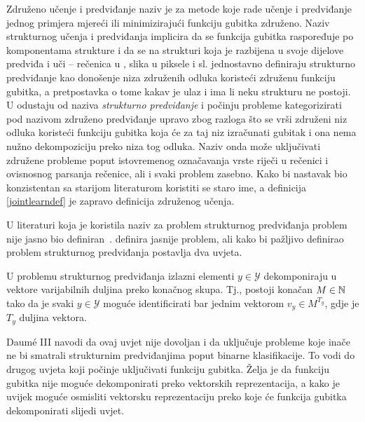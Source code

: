 Združeno učenje i predviđanje  naziv je
za metode koje rade učenje i predviđanje jednog primjera mjereći ili
minimizirajući funkciju gubitka združeno. Naziv strukturnog učenja i predviđanja
 implicira da se funkcija gubitka
raspoređuje po komponentama strukture i da se na strukturi koja je razbijena u
svoje dijelove predviđa i uči -- rečenica u , slika u piksele
i sl. \citet{daume14lts} jednostavno definiraju strukturno predviđanje kao
donošenje niza združenih odluka koristeći združenu funkciju gubitka, a
pretpostavka o tome kakav je ulaz i ima li neku strukturu ne postoji. U
\citep{daume15naacltalk} odustaju od naziva \emph{strukturno predviđanje} i
počinju probleme kategorizirati pod nazivom združeno predviđanje upravo zbog
razloga što se vrši združeni niz odluka koristeći funkciju gubitka koja će za
taj niz izračunati gubitak i ona nema nužno dekompoziciju preko niza tog odluka.
Naziv onda može uključivati združene probleme poput istovremenog označavanja
vrste riječi u rečenici i ovisnosnog parsanja rečenice, ali i svaki problem
zasebno. Kako bi nastavak bio konzistentan sa starijom literaturom koristiti se
staro ime, a definicija \ref{jointlearndef} je zapravo definicija združenog
učenja.

U literaturi koja je koristila naziv za problem strukturnog predviđanja problem
nije jasno bio definiran~\citep{mccallum2000maximum, punyakanok2001use,
lafferty2001conditional, collins2002discriminative, taskar2003maximum,
mcallester2004case, tsochantaridis2005large}. \citet{daume06thesis} definira
jasnije problem, ali kako bi pažljivo definirao problem strukturnog predviđanja
postavlja dva uvjeta.

\begin{condition}

  U problemu strukturnog predviđanja izlazni elementi $y \in \mathcal{Y}$
  dekomponiraju u vektore varijabilnih duljina preko konačnog skupa. Tj.,
  postoji konačan $M \in \mathbb{N}$ tako da je svaki $y \in \mathcal{Y}$ moguće
  identificirati bar jednim vektorom $v_y \in M^{T_y}$, gdje je $T_y$ duljina
  vektora.

\end{condition}

Daum\'e III navodi da ovaj uvjet nije dovoljan i da uključuje probleme koje
inače ne bi smatrali strukturnim predviđanjima poput binarne klasifikacije. To
vodi do drugog uvjeta koji počinje uključivati funkciju gubitka. Želja je da
funkciju gubitka nije moguće dekomponirati preko vektorskih reprezentacija, a
kako je uvijek moguće osmisliti vektorsku reprezentaciju preko koje će funkcija
gubitka dekomponirati slijedi uvjet.


